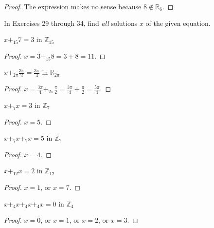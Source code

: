 \begin{proof}
    The expression makes no sense because $8\notin \mathbb{R}_{6}$.
\end{proof}

In Exercises 29 through 34, find \textit{all} solutions $x$ of the given equation.

\begin{exercise}
    $x {+}_{15} 7 = 3$ in $\mathbb{Z}_{15}$
\end{exercise}

\begin{proof}
    $x = 3 {+}_{15} 8 = 3 + 8 = 11$.
\end{proof}

\begin{exercise}
    $x {+}_{2\pi} \frac{3\pi}{2} = \frac{3\pi}{4}$ in $\mathbb{R}_{2\pi}$
\end{exercise}

\begin{proof}
    $x = \frac{3\pi}{4} {+}_{2\pi} \frac{\pi}{2} = \frac{3\pi}{4} + \frac{\pi}{2} = \frac{5\pi}{4}$.
\end{proof}

\begin{exercise}
    $x {+}_{7} x = 3$ in $\mathbb{Z}_{7}$
\end{exercise}

\begin{proof}
    $x = 5$.
\end{proof}

\begin{exercise}
    $x {+}_{7} x {+}_{7} x = 5$ in $\mathbb{Z}_{7}$
\end{exercise}

\begin{proof}
    $x = 4$.
\end{proof}

\begin{exercise}
    $x {+}_{12} x = 2$ in $\mathbb{Z}_{12}$
\end{exercise}

\begin{proof}
    $x = 1$, or $x = 7$.
\end{proof}

\begin{exercise}
    $x {+}_{4} x {+}_{4} x {+}_{4} x = 0$ in $\mathbb{Z}_{4}$
\end{exercise}

\begin{proof}
    $x = 0$, or $x = 1$, or $x = 2$, or $x = 3$.
\end{proof}

